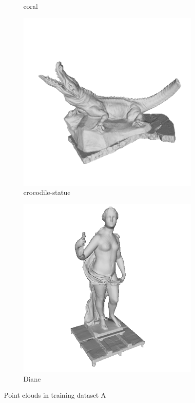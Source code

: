 \begin{figure}
\begin{subfigure}[b]{0.23\linewidth}
		\caption{coral}
	\end{subfigure}
	\begin{subfigure}[b]{0.23\linewidth}
		\includegraphics[width=\linewidth]{./Figures/train-dataset/14.crocodile-statue.png}
		\caption{crocodile-statue}
	\end{subfigure}
	\begin{subfigure}[b]{0.23\linewidth}
		\includegraphics[width=\linewidth]{./Figures/train-dataset/15.diane.png}
		\caption{Diane}
	\end{subfigure}

	\label{fig:dataset_a}
\caption{Point clouds in training dataset A }
\end{figure}


